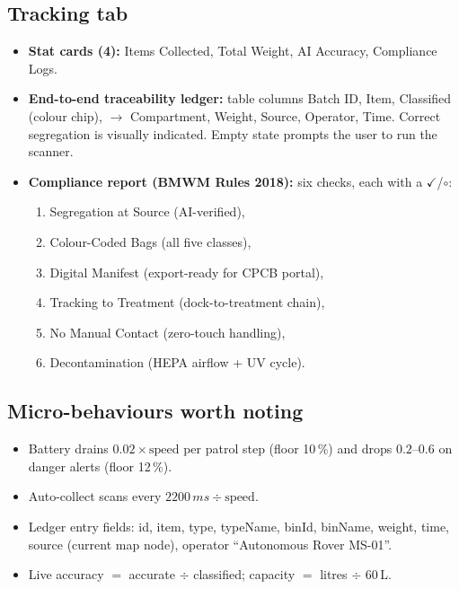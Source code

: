 \documentclass[11pt, a4paper]{article}
\begin{document}
\subsection{Tracking tab}
\begin{itemize}[leftmargin=1.6em, itemsep=2pt]
  \item \textbf{Stat cards (4):} Items Collected, Total Weight, AI Accuracy,
        Compliance Logs.
  \item \textbf{End-to-end traceability ledger:} table columns Batch ID, Item,
        Classified (colour chip), $\rightarrow$ Compartment, Weight, Source,
        Operator, Time. Correct segregation is visually indicated. Empty state
        prompts the user to run the scanner.
  \item \textbf{Compliance report (BMWM Rules 2018):} six checks, each with a
        $\checkmark$/$\circ$:
    \begin{enumerate}[leftmargin=1.6em, itemsep=2pt]
      \item Segregation at Source (AI-verified),
      \item Colour-Coded Bags (all five classes),
      \item Digital Manifest (export-ready for CPCB portal),
      \item Tracking to Treatment (dock-to-treatment chain),
      \item No Manual Contact (zero-touch handling),
      \item Decontamination (HEPA airflow + UV cycle).
    \end{enumerate}
\end{itemize}

\subsection{Micro-behaviours worth noting}
\begin{itemize}[leftmargin=1.6em, itemsep=2pt]
  \item Battery drains $0.02 \times \text{speed}$ per patrol step (floor 10\,\%)
        and drops $0.2$--$0.6$ on danger alerts (floor 12\,\%).
  \item Auto-collect scans every $2200\,ms \div \text{speed}$.
  \item Ledger entry fields: id, item, type, typeName, binId, binName, weight,
        time, source (current map node), operator
        ``Autonomous Rover MS-01''.
  \item Live accuracy $=$ accurate $\div$ classified; capacity $=$
        litres $\div$ 60\,L.
\end{itemize}
\end{document}
